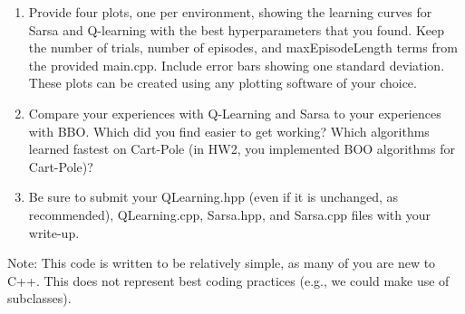 \documentclass[]{article}
\begin{document}
\begin{enumerate}
    \item Provide four plots, one per environment, showing the learning curves for Sarsa and Q-learning with the best hyperparameters that you found. Keep the number of trials, number of episodes, and maxEpisodeLength terms from the provided main.cpp. Include error bars showing one standard deviation. These plots can be created using any plotting software of your choice.
    \item Compare your experiences with Q-Learning and Sarsa to your experiences with BBO. Which did you find easier to get working? Which algorithms learned fastest on Cart-Pole (in HW2, you implemented BOO algorithms for Cart-Pole)?
    \item Be sure to submit your QLearning.hpp (even if it is unchanged, as recommended), QLearning.cpp, Sarsa.hpp, and Sarsa.cpp files with your write-up.
\end{enumerate}

Note: This code is written to be relatively simple, as many of you are new to C++. This does not represent best coding practices (e.g., we could make use of subclasses).
\end{document}
